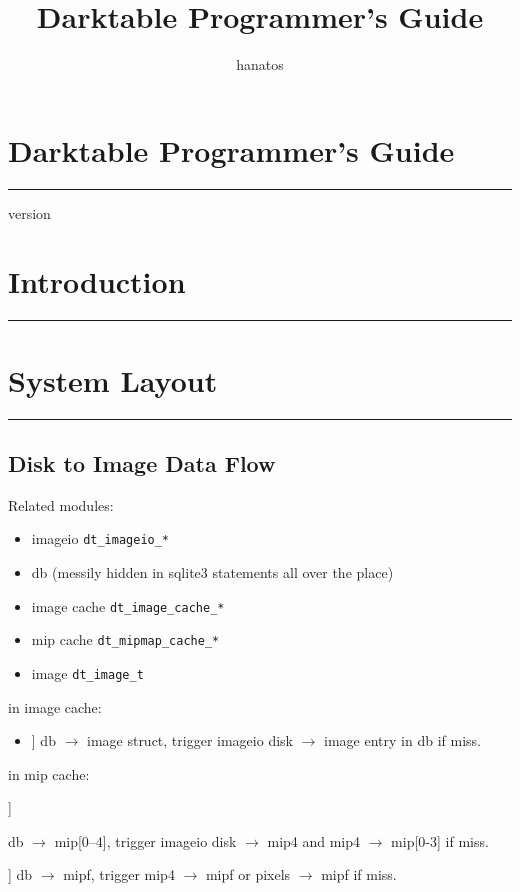 \documentclass[a4paper,twoside]{scrartcl}
\title{Darktable Programmer's Guide}
\author{hanatos}
\newcommand{\nicesection}[2]{%
\cleardoublepage
\fbox{\texttt{[image: \#1]}}%
\vspace*{-1em}%
\section{\hfill #2}
\hrule
\vspace*{\baselineskip}%
}
\newcommand{\code}[1]{\texttt{\color{codecol}#1}}
\begin{document}
%
\vspace*{-1em}%
\section*{\hfill Darktable Programmer's Guide}
\hrule

\vspace*{4\baselineskip}

{\hfill version  }

\thispagestyle{empty}

\newpage
\tableofcontents


\nicesection{header1}{Introduction}
\label{sec:introduction}


\nicesection{header2}{System Layout}

\resizebox{\linewidth}{!}{}

\subsection{Disk to Image Data Flow}

Related modules:
\begin{itemize}
  \item imageio \code{dt\_imageio\_*}
  \item db (messily hidden in sqlite3 statements all over the place)
  \item image cache \code{dt\_image\_cache\_*}
  \item mip cache \code{dt\_mipmap\_cache\_*}
  \item image \code{dt\_image\_t}
\end{itemize}

in image cache:
\begin{itemize}
  \item[[todo]] db $\rightarrow$ image struct, trigger imageio disk $\rightarrow$ image entry in db if miss.
\end{itemize}

in mip cache:
\begin{itemize}
{\color{red}\item[[todo]]} db $\rightarrow$ mip[0--4], trigger imageio disk $\rightarrow$ mip4 and mip4 $\rightarrow$ mip[0-3] if miss.
  \item[[todo]] db $\rightarrow$ mipf, trigger mip4 $\rightarrow$ mipf or pixels $\rightarrow$ mipf if miss.
\end{itemize}
\end{document}
